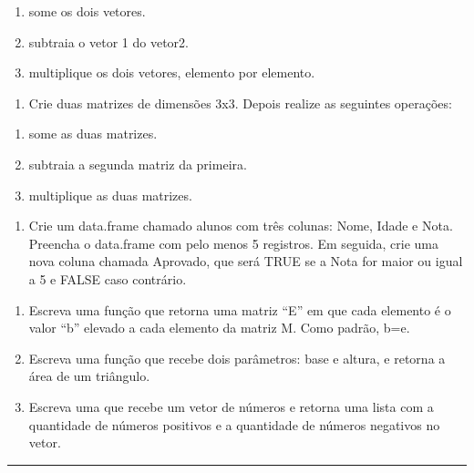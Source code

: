 \documentclass[
]{book}
\providecommand{\tightlist}{%
  \setlength{\itemsep}{0pt}\setlength{\parskip}{0pt}}
\begin{document}
\begin{enumerate}
\def\labelenumi{\alph{enumi}.}
\tightlist
\item
  some os dois vetores.
\item
  subtraia o vetor 1 do vetor2.
\item
  multiplique os dois vetores, elemento por elemento.
\end{enumerate}

\begin{enumerate}
\def\labelenumi{\arabic{enumi})}
\setcounter{enumi}{1}
\tightlist
\item
  Crie duas matrizes de dimensões 3x3. Depois realize as seguintes operações:
\end{enumerate}

\begin{enumerate}
\def\labelenumi{\alph{enumi}.}
\tightlist
\item
  some as duas matrizes.
\item
  subtraia a segunda matriz da primeira.
\item
  multiplique as duas matrizes.
\end{enumerate}

\begin{enumerate}
\def\labelenumi{\arabic{enumi}.}
\setcounter{enumi}{2}
\tightlist
\item
  Crie um data.frame chamado alunos com três colunas: Nome, Idade e Nota. Preencha o data.frame com pelo menos 5 registros. Em seguida, crie uma nova coluna chamada Aprovado, que será TRUE se a Nota for maior ou igual a 5 e FALSE caso contrário.
\end{enumerate}

\begin{enumerate}
\def\labelenumi{\arabic{enumi})}
\setcounter{enumi}{3}
\item
  Escreva uma função que retorna uma matriz ``E'' em que cada elemento é o valor ``b'' elevado a cada elemento da matriz M. Como padrão, b=e.
\item
  Escreva uma função que recebe dois parâmetros: base e altura, e retorna a área de um triângulo.
\item
  Escreva uma que recebe um vetor de números e retorna uma lista com a quantidade de números positivos e a quantidade de números negativos no vetor.
\end{enumerate}

\begin{center}\rule{0.5\linewidth}{0.5pt}\end{center}
\end{document}
